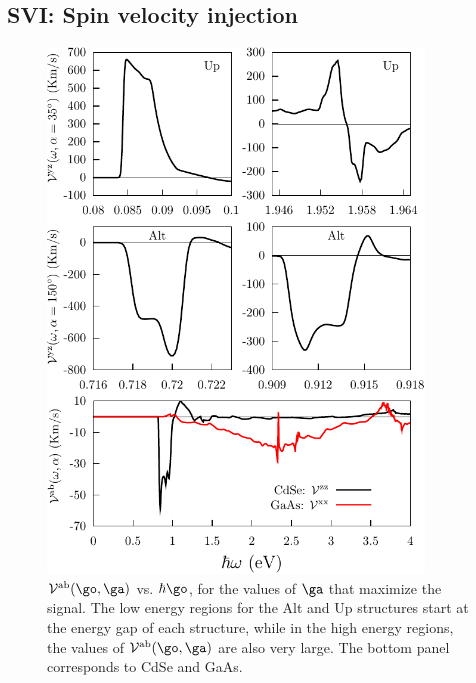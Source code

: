 \documentclass[floatfix,prb,aps,superscriptaddress,showpacs,11pt,preprint,letterpaper]{revtex4}
\def\tama{10cm}
\begin{document}

\subsection{SVI: Spin velocity injection} %
\label{sec:res-spin_velocity}

\begin{figure}[t]
\centering
\includegraphics[width=\tama]{plots/2-vab-str-comp}
\caption{$\mathcal{V}^{\mathrm{ab}}(\go,\ga)$ 
  vs. $\hbar\go$, for the values of $\ga$ that maximize the signal. The low
  energy regions for the Alt and Up structures start at the energy gap of each
  structure, while in the high energy regions, the values of
  $\mathcal{V}^{\mathrm{ab}}(\go,\ga)$ are also very large. The bottom panel
  corresponds to CdSe and GaAs. }
\label{fig:vab-str-comp}
\end{figure}
\end{document}
